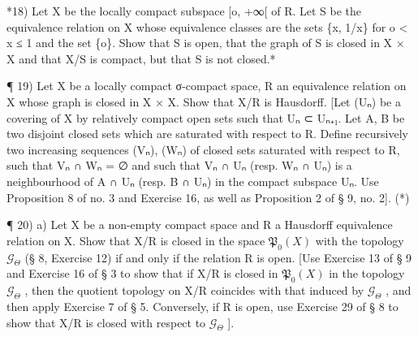 *18) Let X be the locally compact subspace {[}o, +∞{[} of R. Let S be the equivalence relation on X whose equivalence classes are the sets \{x, 1/x\} for o \textless{} x ≤ 1 and the set \{o\}. Show that S is open, that the graph of S is closed in X × X and that X/S is compact, but that S is not closed.*

¶ 19) Let X be a locally compact σ-compact space, R an equivalence relation on X whose graph is closed in X × X. Show that X/R is Hausdorff. {[}Let (Uₙ) be a covering of X by relatively compact open sets such that Uₙ ⊂ Uₙ₊₁. Let A, B be two disjoint closed sets which are saturated with respect to R. Define recursively two increasing sequences (Vₙ), (Wₙ) of closed sets saturated with respect to R, such that Vₙ ∩ Wₙ = ∅ and such that Vₙ ∩ Uₙ (resp. Wₙ ∩ Uₙ) is a neighbourhood of A ∩ Uₙ (resp. B ∩ Uₙ) in the compact subspace Uₙ. Use Proposition 8 of no. 3 and Exercise 16, as well as Proposition 2 of § 9, no. 2{]}. (*)

¶ 20) a) Let X be a non-empty compact space and R a Hausdorff equivalence relation on X. Show that X/R is closed in the space \(\mathfrak{P}_{0}(X)\) with the topology \(\mathcal{G}_{\Theta}\) (§ 8, Exercise 12) if and only if the relation R is open. {[}Use Exercise 13 of § 9 and Exercise 16 of § 3 to show that if X/R is closed in \(\mathfrak{P}_{0}(X)\) in the topology \(\mathcal{G}_{\Theta}\) , then the quotient topology on X/R coincides with that induced by \(\mathcal{G}_{\Theta}\) , and then apply Exercise 7 of § 5. Conversely, if R is open, use Exercise 29 of § 8 to show that X/R is closed with respect to \(\mathcal{G}_{\Theta}\) {]}.


